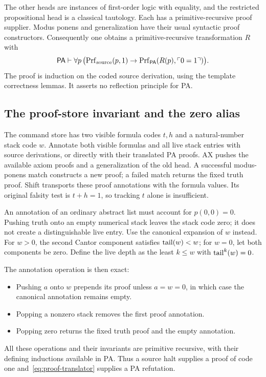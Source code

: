The other heads are instances of first-order logic with equality, and the restricted propositional head is a classical tautology. Each has a primitive-recursive proof supplier. Modus ponens and generalization have their usual syntactic proof constructors. Consequently one obtains a primitive-recursive transformation $R$ with
\begin{equation}\label{eq:proof-translator}
 \mathsf{PA}\vdash\forall p\,
 \bigl(\operatorname{Prf}_{\mathrm{source}}(p,1)
 \to\operatorname{Prf}_{\mathsf{PA}}(R(p),\ulcorner0=1\urcorner)\bigr).
\end{equation}
The proof is induction on the coded source derivation, using the template correctness lemmas. It asserts no reflection principle for PA.

\subsection{The proof-store invariant and the zero alias}
The command store has two visible formula codes $t,h$ and a natural-number stack code $w$. Annotate both visible formulas and all live stack entries with source derivations, or directly with their translated PA proofs. AX pushes the available axiom proofs and a generalization of the old head. A successful modus-ponens match constructs a new proof; a failed match returns the fixed truth proof. Shift transports these proof annotations with the formula values. Its original falsity test is $t+h=1$, so tracking $t$ alone is insufficient.

An annotation of an ordinary abstract list must account for $p(0,0)=0$. Pushing truth onto an empty numerical stack leaves the stack code zero; it does not create a distinguishable live entry. Use the canonical expansion of $w$ instead. For $w>0$, the second Cantor component satisfies $\operatorname{tail}(w)<w$; for $w=0$, let both components be zero. Define the live depth as the least $k\le w$ with $\operatorname{tail}^k(w)=0$.

The annotation operation is then exact:
\begin{itemize}
\item Pushing $a$ onto $w$ prepends its proof unless $a=w=0$, in which case the canonical annotation remains empty.
\item Popping a nonzero stack removes the first proof annotation.
\item Popping zero returns the fixed truth proof and the empty annotation.
\end{itemize}
All these operations and their invariants are primitive recursive, with their defining inductions available in PA. Thus a source halt supplies a proof of code one and~\eqref{eq:proof-translator} supplies a PA refutation.

